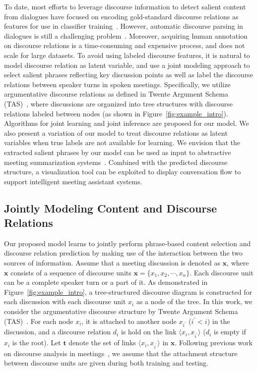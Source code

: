 To date, most efforts to leverage discourse information to detect salient content from dialogues have focused on encoding gold-standard discourse relations as features for use in classifier training~\cite{murray2006incorporating,Galley:2006:SCR:1610075.1610126,mckeown2007using,Bui:2009:EDM:1708376.1708410}. However, automatic discourse parsing in dialogues is still a challenging problem~\cite{perret-EtAl:2016:N16-1}. Moreover, acquiring human annotation on discourse relations is a time-consuming and expensive process, and does not scale for large datasets. To avoid using labeled discourse features, it is natural to model discourse relation as latent variable, and use a joint modeling approach to select salient phrases reflecting key discussion points as well as label the discourse relations between speaker turns in spoken meetings. Specifically, we utilize argumentative discourse relations as defined in Twente Argument Schema (TAS)~\cite{so65562}, where discussions are organized into tree structures with discourse relations labeled between nodes (as shown in Figure~\ref{fig:example_intro}). Algorithms for joint learning and joint inference are proposed for our model. We also present a variation of our model to treat discourse relations as latent variables when true labels are not available for learning. We envision that the extracted salient phrases by our model can be used as input to abstractive meeting summarization systems~\cite{wang-cardie:2013:ACL2013,mehdad-carenini-ng:2014:P14-1}. Combined with the predicted discourse structure, a visualization tool can be exploited to display conversation flow to support intelligent meeting assistant systems.


\subsection{Jointly Modeling Content and Discourse Relations}

Our proposed model learns to jointly perform phrase-based content selection and discourse relation prediction by making use of the interaction between the two sources of information. 
%
Assume that a meeting discussion is denoted as $\mathbf{x}$, where $\mathbf{x}$ consists of a sequence of discourse units $\mathbf{x}=\{x_{1}, x_{2}, \cdots ,x_{n}\}$. Each discourse unit can be a complete speaker turn or a part of it. As demonstrated in Figure~\ref{fig:example_intro}, a tree-structured discourse diagram is constructed for each discussion with each discourse unit $x_{i}$ as a node of the tree. In this work, we consider the argumentative discourse structure by Twente Argument Schema (TAS)~\cite{so65562}. 
%
For each node $x_{i}$, it is attached to another node $x_{i^\prime}$ ($i^\prime<i$) in the discussion, and a discourse relation $d_{i}$ is hold on the link $\langle x_{i}, x_{i^\prime} \rangle$ ($d_{i}$ is empty if $x_{i}$ is the root). Let $\mathbf{t}$ denote the set of links $\langle x_{i}, x_{i^\prime} \rangle$ in $\mathbf{x}$.
%
Following previous work on discourse analysis in meetings~\cite{so65562,hakkani2009towards}, we assume that the attachment structure between discourse units are given during both training and testing. 


